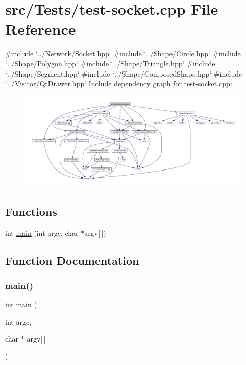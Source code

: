 \hypertarget{test-socket_8cpp}{}\section{src/\+Tests/test-\/socket.cpp File Reference}
\label{test-socket_8cpp}
{\ttfamily \#include \char`\"{}../\+Network/\+Socket.\+hpp\char`\"{}}\newline
{\ttfamily \#include \char`\"{}../\+Shape/\+Circle.\+hpp\char`\"{}}\newline
{\ttfamily \#include \char`\"{}../\+Shape/\+Polygon.\+hpp\char`\"{}}\newline
{\ttfamily \#include \char`\"{}../\+Shape/\+Triangle.\+hpp\char`\"{}}\newline
{\ttfamily \#include \char`\"{}../\+Shape/\+Segment.\+hpp\char`\"{}}\newline
{\ttfamily \#include \char`\"{}../\+Shape/\+Composed\+Shape.\+hpp\char`\"{}}\newline
{\ttfamily \#include \char`\"{}../\+Visitor/\+Qt\+Drawer.\+hpp\char`\"{}}\newline
Include dependency graph for test-\/socket.cpp\+:\nopagebreak
\begin{figure}[H]
\begin{center}
\leavevmode
\includegraphics[width=350pt]{test-socket_8cpp__incl}
\end{center}
\end{figure}
\subsection*{Functions}
\begin{DoxyCompactItemize}
\item 
int \hyperlink{test-socket_8cpp_a0ddf1224851353fc92bfbff6f499fa97}{main} (int argc, char $\ast$argv\mbox{[}$\,$\mbox{]})
\end{DoxyCompactItemize}


\subsection{Function Documentation}
\hypertarget{test-socket_8cpp_a0ddf1224851353fc92bfbff6f499fa97}{}\label{test-socket_8cpp_a0ddf1224851353fc92bfbff6f499fa97} 
\subsubsection{\texorpdfstring{main()}{main()}}
{\footnotesize\ttfamily int main (\begin{DoxyParamCaption}\item[{int}]{argc,  }\item[{char $\ast$}]{argv\mbox{[}$\,$\mbox{]} }\end{DoxyParamCaption})}

